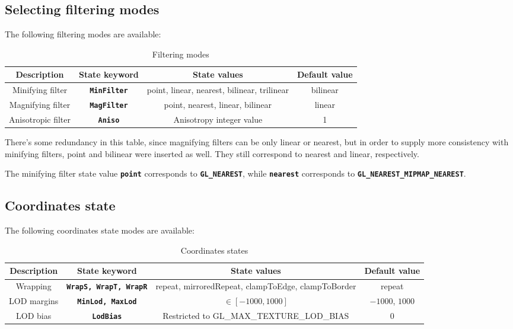 \documentclass[11pt,a4paper,final,titlepage]{article}
\newcommand{\slp}{\left[}
\newcommand{\srp}{\right]}
\begin{document}
\subsection{Selecting filtering modes}
The following filtering modes are available:
\begin{table}[h]
\centering
\begin{tabulary}{\linewidth}{|C|C|C|C|}
\hline
Description & State keyword & State values & Default value\\
\hline\hline
Minifying filter & \texttt{\textbf{MinFilter}} & point, linear, nearest, bilinear, trilinear & bilinear\\
\hline
Magnifying filter & \texttt{\textbf{MagFilter}} & point, nearest, linear, bilinear & linear\\
\hline
Anisotropic filter & \texttt{\textbf{Aniso}} & Anisotropy integer value & 1\\
\hline
\end{tabulary}
\caption{Filtering modes}
\label{tab:filtModes}
\end{table}

There's some redundancy in this table, since magnifying filters can be only linear or nearest,
but in order to supply more consistency with minifying filters, point and bilinear were inserted
as well. They still correspond to nearest and linear, respectively.

The minifying filter state value \texttt{\textbf{point}} corresponds to \texttt{\textbf{GL\_\-NEAREST}},
while \texttt{\textbf{nearest}} corresponds to \texttt{\textbf{GL\_\-NEAREST\_\-MIPMAP\_\-NEAREST}}.

\subsection{Coordinates state}
The following coordinates state modes are available:
\begin{table}[h]
\centering
\begin{tabulary}{\linewidth}{|C|C|C|C|}
\hline
Description & State keyword & State values & Default value\\
\hline\hline
Wrapping & \texttt{\textbf{WrapS, WrapT, WrapR}} &
repeat, mirroredRepeat, clampToEdge, clampToBorder & repeat\\
\hline
LOD margins & \texttt{\textbf{MinLod, MaxLod}} & $\in\slp-1000,1000\srp$ & $-1000$, $1000$\\
\hline
LOD bias & \texttt{\textbf{LodBias}} & Restricted to GL\_MAX\_TEXTURE\_LOD\_BIAS & 0\\
\hline
\end{tabulary}
\caption{Coordinates states}
\label{tab:coordModes}
\end{table}
\end{document}
